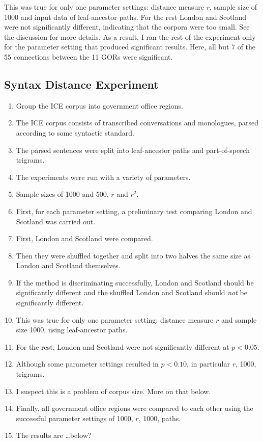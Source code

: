 \documentclass[11pt]{article}
\begin{document}
This was true for only one parameter settings: distance measure $r$,
sample size of 1000 and input data of leaf-ancestor paths. For the
rest London and Scotland were not significantly different, indicating
that the corpora were too small. See the discussion for more details.
As a result, I ran the rest of the experiment only for the parameter
setting that produced significant results. Here, all but 7 of the 55
connections between the 11 GORs were significant.

\subsection{Syntax Distance Experiment}
\begin{enumerate}
\item Group the ICE corpus into government office regions.
\item The ICE corpus consists of transcribed conversations and
  monologues, parsed according to some syntactic standard.
\item The parsed sentences were split into leaf-ancestor paths and
  part-of-speech trigrams.
\item The experiments were run with a variety of parameters.
\item Sample sizes of 1000 and 500, $r$ and $r^2$.
\item First, for each parameter setting, a preliminary test comparing
  London and Scotland was carried out.
\item First, London and Scotland were compared.
\item Then they were shuffled together and split into two halves the
  same size as London and Scotland themselves.
\item If the method is discriminating successfully, London and
  Scotland should be significantly different and the shuffled London
  and Scotland should {\em not} be significantly different.
\item This was true for only one parameter setting: distance measure
  $r$ and sample size 1000, using leaf-ancestor paths.
\item For the rest, London and Scotland were not significantly
  different at $p < 0.05$.
\item Although some parameter settings resulted in $p < 0.10$, in
  particular $r$, 1000, trigrams.
\item I suspect this is a problem of corpus size. More on that below.
\item Finally, all government office regions were compared to each
  other using the successful parameter settings of 1000, $r$, 1000,
  paths.
\item The results are \ldots below?
\end{enumerate}
\end{document}
